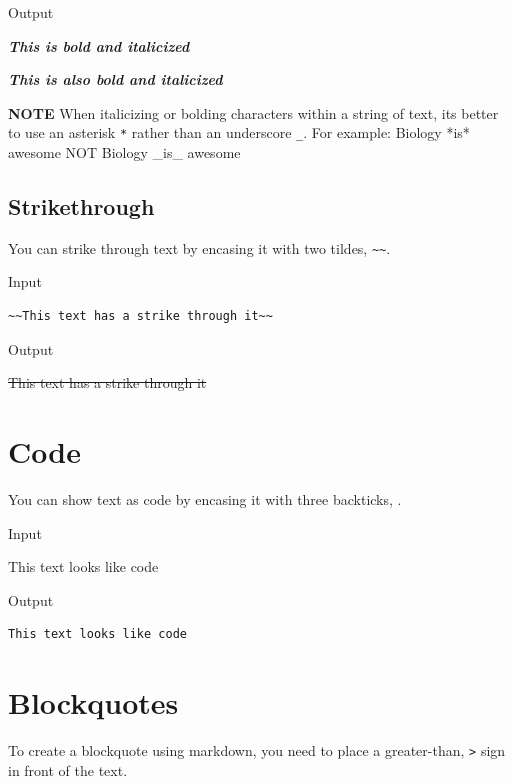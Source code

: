 \documentclass[
]{book}
\begin{document}
Output

\textbf{\emph{This is bold and italicized}}

\textbf{\emph{This is also bold and italicized}}

\textbf{NOTE} When italicizing or bolding characters within a string of text, it\textquotesingle s better to use an asterisk \texttt{*} rather than an underscore \texttt{\_}. For example: Biology *is* awesome NOT Biology \_is\_ awesome

\hypertarget{strikethrough}{%
\subsection*{Strikethrough}\label{strikethrough}}

You can strike through text by encasing it with two tildes, \texttt{\textasciitilde{}\textasciitilde{}}.

Input

\begin{verbatim}
~~This text has a strike through it~~
\end{verbatim}

Output

\sout{This text has a strike through it}

\hypertarget{code}{%
\section{Code}\label{code}}

You can show text as code by encasing it with three backticks, \texttt{\textasciigrave{}\textasciigrave{}\textasciigrave{}}.

Input

\texttt{\textasciigrave{}\textasciigrave{}\textasciigrave{}}

This text looks like code

\texttt{\textasciigrave{}\textasciigrave{}\textasciigrave{}}

Output

\begin{verbatim}
This text looks like code
\end{verbatim}

\hypertarget{blockquotes}{%
\section{Blockquotes}\label{blockquotes}}

To create a blockquote using markdown, you need to place a greater-than, \texttt{\textgreater{}} sign in front of the text.
\end{document}
